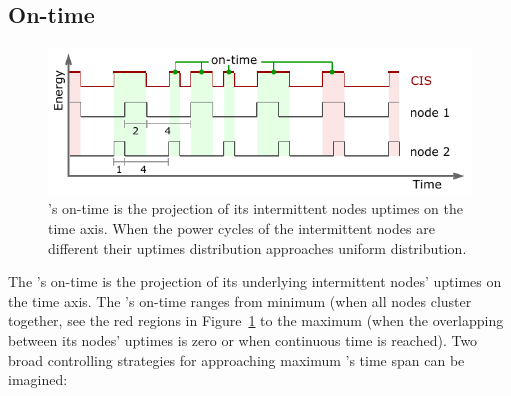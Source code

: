 \subsection{On-time}
%
\begin{figure}[t]
		\centering
		\includegraphics[width=\columnwidth]{figures/cisOntime}
		\caption{\fullsys's on-time is the projection of its intermittent nodes uptimes on the time axis. When the power cycles of the intermittent nodes are different their uptimes distribution approaches uniform distribution.}
		\label{fig:cisOntime}
\end{figure} 
%
The \sys's on-time is the projection of its underlying intermittent nodes' uptimes on the time axis. The \sys's on-time ranges from minimum (when all nodes cluster together, see the red regions in Figure~\ref{fig:cisOntime} to the maximum (when the overlapping between its nodes' uptimes is zero or when continuous time is reached). Two broad controlling strategies for approaching maximum \sys's time span can be imagined: 
